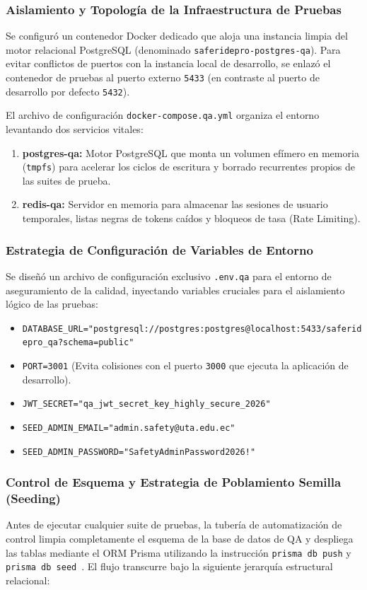 \documentclass{article}
\begin{document}
\subsubsection*{Aislamiento y Topología de la Infraestructura de Pruebas}
Se configuró un contenedor Docker dedicado que aloja una instancia limpia del motor relacional PostgreSQL (denominado \texttt{saferidepro-postgres-qa}). Para evitar conflictos de puertos con la instancia local de desarrollo, se enlazó el contenedor de pruebas al puerto externo \texttt{5433} (en contraste al puerto de desarrollo por defecto \texttt{5432}).

El archivo de configuración \texttt{docker-compose.qa.yml} organiza el entorno levantando dos servicios vitales:
\begin{enumerate}
    \item \textbf{postgres-qa:} Motor PostgreSQL que monta un volumen efímero en memoria (\texttt{tmpfs}) para acelerar los ciclos de escritura y borrado recurrentes propios de las suites de prueba.
    \item \textbf{redis-qa:} Servidor en memoria para almacenar las sesiones de usuario temporales, listas negras de tokens caídos y bloqueos de tasa (Rate Limiting).
\end{enumerate}

\subsubsection*{Estrategia de Configuración de Variables de Entorno}
Se diseñó un archivo de configuración exclusivo \texttt{.env.qa} para el entorno de aseguramiento de la calidad, inyectando variables cruciales para el aislamiento lógico de las pruebas:
\begin{itemize}
    \item \texttt{DATABASE\_URL="postgresql://postgres:postgres@localhost:5433/saferidepro\_qa?schema=public"}
    \item \texttt{PORT=3001} (Evita colisiones con el puerto \texttt{3000} que ejecuta la aplicación de desarrollo).
    \item \texttt{JWT\_SECRET="qa\_jwt\_secret\_key\_highly\_secure\_2026"}
    \item \texttt{SEED\_ADMIN\_EMAIL="admin.safety@uta.edu.ec"}
    \item \texttt{SEED\_ADMIN\_PASSWORD="SafetyAdminPassword2026!"}
\end{itemize}

\subsubsection*{Control de Esquema y Estrategia de Poblamiento Semilla (Seeding)}
Antes de ejecutar cualquier suite de pruebas, la tubería de automatización de control limpia completamente el esquema de la base de datos de QA y despliega las tablas mediante el ORM Prisma utilizando la instrucción \texttt{prisma db push} y \texttt{prisma db seed}~\cite{prismadocs}. El flujo transcurre bajo la siguiente jerarquía estructural relacional:
\end{document}
